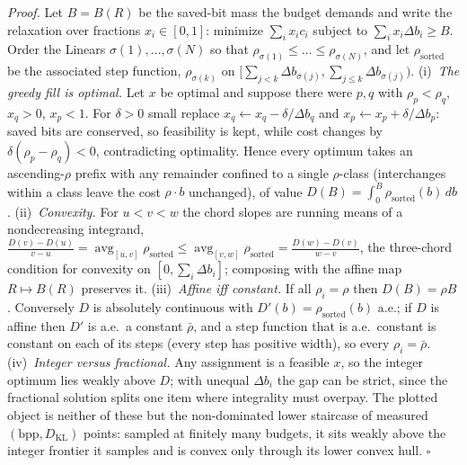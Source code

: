 \documentclass[11pt]{article}
\theoremstyle{plain}
\theoremstyle{definition}
\newcommand{\bpp}{\mathrm{bpp}}
\newcommand{\kl}{D_{\mathrm{KL}}}
\begin{document}
\noindent\emph{Proof.} Let $B=B(R)$ be the saved-bit mass the budget demands and
write the relaxation over fractions $x_i\in[0,1]$: minimize $\sum_i x_ic_i$
subject to $\sum_i x_i\Delta b_i\ge B$. Order the Linears
$\sigma(1),\dots,\sigma(N)$ so that $\rho_{\sigma(1)}\le\dots\le\rho_{\sigma(N)}$,
and let $\rho_{\mathrm{sorted}}$ be the associated step function,
$\rho_{\sigma(k)}$ on $[\sum_{j<k}\Delta b_{\sigma(j)},\sum_{j\le k}\Delta b_{\sigma(j)})$.
(i)~\emph{The greedy fill is optimal.} Let $x$ be optimal and suppose there were
$p,q$ with $\rho_p<\rho_q$, $x_q>0$, $x_p<1$. For $\delta>0$ small replace
$x_q\leftarrow x_q-\delta/\Delta b_q$ and $x_p\leftarrow x_p+\delta/\Delta b_p$:
saved bits are conserved, so feasibility is kept, while cost changes by
$\delta(\rho_p-\rho_q)<0$, contradicting optimality. Hence every optimum takes an
ascending-$\rho$ prefix with any remainder confined to a single $\rho$-class
(interchanges within a class leave the cost $\rho\cdot b$ unchanged), of value
$D(B)=\int_0^B\rho_{\mathrm{sorted}}(b)\,db$.
(ii)~\emph{Convexity.} For $u<v<w$ the chord slopes are running means of a
nondecreasing integrand,
$\tfrac{D(v)-D(u)}{v-u}=\operatorname{avg}_{[u,v]}\rho_{\mathrm{sorted}}\le
\operatorname{avg}_{[v,w]}\rho_{\mathrm{sorted}}=\tfrac{D(w)-D(v)}{w-v}$,
the three-chord condition for convexity on $[0,\sum_i\Delta b_i]$; composing with
the affine map $R\mapsto B(R)$ preserves it.
(iii)~\emph{Affine iff constant.} If all $\rho_i=\rho$ then $D(B)=\rho B$. Conversely
$D$ is absolutely continuous with $D'(b)=\rho_{\mathrm{sorted}}(b)$ a.e.; if $D$ is
affine then $D'$ is a.e.\ a constant $\bar\rho$, and a step function that is a.e.\
constant is constant on each of its steps (every step has positive width), so every
$\rho_i=\bar\rho$.
(iv)~\emph{Integer versus fractional.} Any assignment is a feasible $x$, so the
integer optimum lies weakly above $D$; with unequal $\Delta b_i$ the gap can be
strict, since the fractional solution splits one item where integrality must
overpay. The plotted object is neither of these but the non-dominated lower
staircase of measured $(\bpp,\kl)$ points: sampled at finitely many budgets, it sits
weakly above the integer frontier it samples and is convex only through its lower
convex hull. \hfill$\square$
\end{document}
